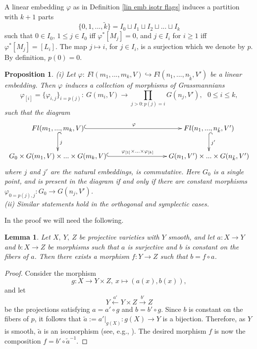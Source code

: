 \documentclass[12pt]{amsart}
\renewcommand{\phi}{\varphi}
\newtheorem{proposition}[theorem]{Proposition}
\newtheorem{lemma}[theorem]{Lemma}
\theoremstyle{definition}
\begin{document}
A linear embedding $\phi$ as in Definition \ref{lin emb 
isotr flags} induces a partition with $k+1$ parts 
$$
\{0,1,...,\tilde{k}\}=I_0\sqcup I_1\sqcup I_2\sqcup...\sqcup I_k
$$ 
such that $0\in I_0$, $1\le j\in I_0$ 
iff $\phi^*[M_j]=0$, and $j\in I_i$ for $i\ge1$ 
iff $\phi^*[M_j]=[L_i]$. The map $j\mapsto i$, for $j\in I_i$, 
is a surjection which we denote by $p$. By definition, 
$p(0)=0$.


\begin{proposition}\label{extension to Grassm growth}
(i) Let $\varphi:\ Fl(m_1,...,m_k,V)\hookrightarrow Fl(n_1,...,
n_{\tilde{k}},V')$ be a linear embedding. Then $\phi$ induces a
collection of morphisms of Grassmannians
\begin{equation*}\label{colln general}
\varphi_{[i]}=\{\varphi_{i,j}\}_{i=p(j)}:\ G(m_i,V)\to
\underset{j>0:p(j)=i}{\prod}G(n_j,V'),\ \ \ 0\le i\le k,
\end{equation*}
such that the diagram
\begin{equation}\label{diagram 1}
\xymatrix{
Fl(m_1,...,m_k,V)\ar@{^{(}->}[rrr]^-{\varphi}\ar@{^{(}->}[d]^-{
j} & & & Fl(n_1,...,n_{\tilde{k}},V')
\ar@{^{(}->}[d]^-{j'}\\
G_0\times G(m_1,V)\times...\times G(m_k,V) \ar@{^{(}->} 
[rrr]^-{\phi_{[1]}\times...\times\phi_{[k]}} & & & 
G(n_1,V')\times ...\times G(n_{\tilde{k}},V')}
\end{equation}
where $j$ and $j'$ are the natural embeddings, is commutative.
Here $G_0$ is a single point, and is present in the diagram if
and only if there are constant morphisms $\phi_{0=p(j),j}:
G_0\to G(n_j,V')$.\\
(ii) Similar statements hold in the orthogonal and symplectic 
cases.
\end{proposition}
In the proof we will need the following.
\begin{lemma}\label{lemma1}
\textit{Let $X,\ Y,\ Z$ be projective varieties with
$Y$ smooth, and let $a:X\to Y$ and $b:X\to Z$ be morphisms
such that $a$ is surjective and $b$ is constant on the fibers 
of $a$. Then there exists  a morphism $f:Y\to Z$ such that 
$b=f\circ a$.} 
\end{lemma}
\begin{proof}
Consider the morphism
$$
g:X\to Y\times Z,\ x\mapsto(a(x),b(x)),
$$ 
and let 
$$
Y\xleftarrow{a'}Y\times Z\xrightarrow{b'}Z
$$ 
be the projections satisfying
$a=a'\circ g$ and $b=b'\circ g$. Since $b$ is constant on the
fibers of $p$, it follows that $\tilde{a}:=a'|_{g(X)}:
g(X)\to Y$ is a bijection. Therefore, as $Y$ is smooth, 
$\tilde{a}$ is an isomorphism (see, e.g., \cite[Ch.2, Section 
4.4, Thm. 2.16]{S}). The desired morphism $f$ is now the 
composition $f=b'\circ\tilde{a}^{-1}$.
\end{proof}
\end{document}
